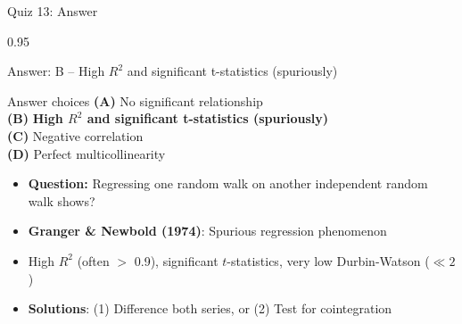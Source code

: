 \documentclass[9pt, aspectratio=169, t]{beamer}
\begin{document}
\begin{frame}{Quiz 13: Answer}
    \begin{cminipage}{0.95\textwidth}
    \begin{exampleblock}{Answer: B -- High $R^2$ and significant t-statistics (spuriously)}

        \vspace{0.3cm}

    \begin{block}{Answer choices}
        \textcolor{MainBlue}{\textbf{(A)}} No significant relationship \incorrect\\[3pt]
        \textcolor{MainBlue}{\textbf{(B)}} \textbf{\textcolor{Forest}{High $R^2$ and significant t-statistics (spuriously)}} \correct\\[3pt]
        \textcolor{MainBlue}{\textbf{(C)}} Negative correlation \incorrect\\[3pt]
        \textcolor{MainBlue}{\textbf{(D)}} Perfect multicollinearity \incorrect
    \end{block}

        \vspace{0.3cm}

        \begin{itemize}\setlength{\itemsep}{0pt}
            \item \textbf{Question:} Regressing one random walk on another independent random walk shows?
            \item \textbf{Granger \& Newbold (1974)}: Spurious regression phenomenon
            \item High $R^2$ (often $>$ 0.9), significant $t$-statistics, very low Durbin-Watson ($\ll 2$)
            \item \textbf{Solutions}: (1) Difference both series, or (2) Test for cointegration
        \end{itemize}
    \end{exampleblock}

    \end{cminipage}
\end{frame}
\end{document}

